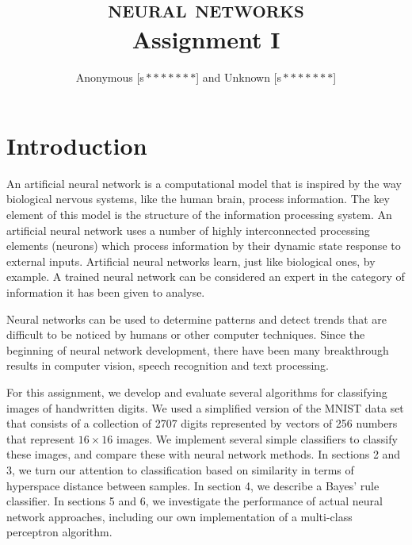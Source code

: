 \documentclass[11pt]{article}
\author{Anonymous [s\,$*******$] and Unknown [s\,$*******$]}
\title{\textsc{\Huge neural networks}\\Assignment I}
\begin{document}
\maketitle

\section{Introduction}

An artificial neural network is a computational model that is inspired by the way biological nervous systems, like the human brain, process information. The key element of this model is the structure of the information processing system. An artificial neural network uses a number of highly interconnected processing elements (neurons) which process information by their dynamic state response to external inputs. Artificial neural networks learn, just like biological ones, by example. A trained neural network can be considered an expert in the category of information it has been given to analyse.\par
Neural networks can be used to determine patterns and detect trends that are difficult to be noticed by humans or other computer techniques. Since the beginning of neural network development, there have been many breakthrough results in computer vision, speech recognition and text processing.\par
For this assignment, we develop and evaluate several algorithms for classifying images of handwritten digits. We used a simplified version of the MNIST data set\cite{mnist} that consists of a collection of 2707 digits represented by vectors of 256 numbers that represent $16\times16$ images. 
We implement several simple classifiers to classify these images, and compare these with neural network methods. In sections 2 and 3, we turn our attention to classification based on similarity in terms of hyperspace distance between samples. In section 4, we describe a Bayes' rule classifier. In sections 5 and 6, we investigate the performance of actual neural network approaches, including our own implementation of a multi-class perceptron algorithm.
\end{document}
